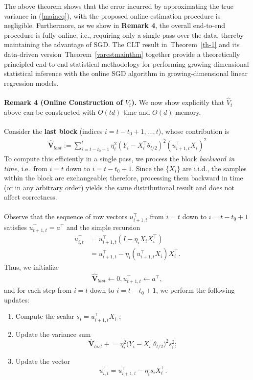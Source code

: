 \documentclass[11pt, reqno,english]{amsart}
\begin{document}
The above theorem shows that the error incurred by approximating the true variance in (\ref{maineq}), with the proposed online estimation procedure is negligible. Furthermore, as we show in \textbf{Remark 4}, the overall end-to-end procedure is fully online, i.e., requiring only a single-pass over the data, thereby maintaining the advantage of SGD. The CLT result in~Theorem~\ref{th-1} and its data-driven version~Theorem~\ref{varestmainthm} together provide a theoretically principled end-to-end statistical methodology for performing growing-dimensional statistical inference with the online SGD algorithm in growing-dimensional linear regression  models. 
\\\\
\noindent \textbf{Remark 4 (Online Construction of $\hat{V}_t$).} We now show explicitly that $\hat{V}_t$ above can be constructed with $O(td)$ time and $O(d)$ memory. 
\\\\
Consider the \textbf{last block} (indices $i = t-t_0 + 1, \dots, t$), whose contribution is
\begin{align*}
    \hat{\mathbf{V}}_{last} := \sum_{i = t-t_0 + 1}^t \eta^2_{i} (Y_i - X^\top_i \theta_{t/2})^2(u^\top_{i+1,t}X_i)^2
\end{align*}
To compute this efficiently in a single pass, we process the block \emph{backward in time}, i.e.\ from $i = t$ down to $i = t - t_0 + 1$. 
Since the $\{X_i\}$ are i.i.d., the samples within the block are exchangeable; therefore, processing them backward in time (or in any arbitrary order) yields the same distributional result and does not affect correctness.
\\\\
Observe that the sequence of row vectors $u^\top_{i+1, t}$ from $i = t$ down to $i = t - t_0 + 1$ satisfies $u^\top_{t+1, t} = a^\top$ and the simple recursion
\begin{align*} 
u^\top_{i,t}  &=  u^\top_{i+1,t}(I -   \eta_i X_i X^\top_i)
\\
&= u^\top_{i+1,t} - \eta_i (u^\top_{i+1,t} X_i)X^\top_i.
\end{align*}
Thus, we initialize 
\begin{align*}
\hat{\mathbf{V}}_{last} \leftarrow 0, u^\top_{t+1, t} \leftarrow a^\top,
\end{align*}
and for each step from $i = t$ down to $i = t-t_0 + 1$, we perform the following updates:
\begin{enumerate}
    \item Compute the scalar $s_i = u^\top_{i+1,t} X_i$ ;
    \item Update the variance sum
    \[
    \hat{\mathbf{V}}_{last} \mathrel{+}= \eta_i^2 
        \bigl(Y_i - X_i^\top \theta_{t/2}\bigr)^2 s_i^2;
    \]
    \item Update the vector
    \[
    u^\top_{i,t} = u^\top_{i+1,t} - \eta_i s_i X_i^\top.
    \]
\end{enumerate}
\end{document}
